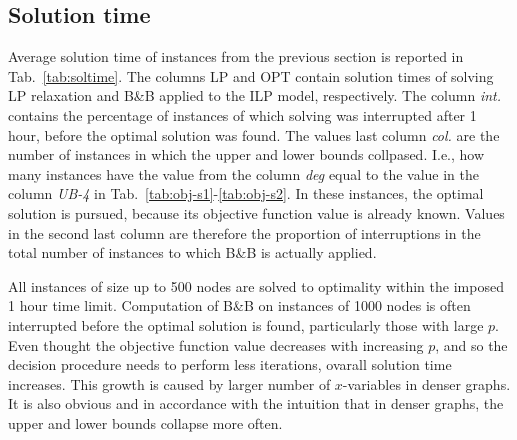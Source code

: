 \subsection{Solution time}

Average solution time of instances from the previous section is reported in Tab.~\ref{tab:soltime}.
The columns LP and OPT contain solution times of solving LP relaxation and B\&B applied to the ILP model, respectively.
The column \emph{int.} contains the percentage of instances of which solving was interrupted after 1 hour, before the optimal solution was found.
The values last column \emph{col.} are the number of instances in which the upper and lower bounds collpased. 
I.e., how many instances have the value from the column \emph{deg} equal to the value in the column \emph{UB-4} in Tab.~\ref{tab:obj-s1}-\ref{tab:obj-s2}.
In these instances, the optimal solution is pursued, because its objective function value is already known.
Values in the second last column are therefore the proportion of interruptions in the total number of instances to which B\&B is actually applied.

All instances of size up to 500 nodes are solved to optimality within the imposed 1 hour time limit.
Computation of B\&B on instances of 1000 nodes is often interrupted before the optimal solution is found, particularly those with large $p$.
Even thought the objective function value decreases with increasing $p$, and so the decision procedure needs to perform less iterations, ovarall solution time increases.
This growth is caused by larger number of $x$-variables in denser graphs.
It is also obvious and in accordance with the intuition that in denser graphs, the upper and lower bounds collapse more often.

